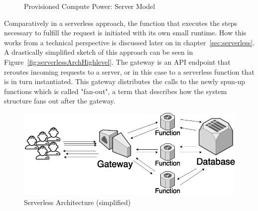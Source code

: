 \begin{figure}[ht]
    \centering
    \caption {Provisioned Compute Power: Server Model}
    \label{graph:provisionedComputePowerServer}
\end{figure}

Comparatively in a serverless approach, the function that executes the steps necessary to fulfill the request is initiated with its own small runtime. How this works from a technical perspective is discussed later on in chapter~\vref{sec:serverless}. A drastically simplified sketch of this approach can be seen in Figure~\vref{fig:serverlessArchHighlevel}. The gateway is an API endpoint that reroutes incoming requests to a server, or in this case to a serverless function that is in turn instantiated. \autocite{Kelly2010UsingInvalidation} This gateway distributes the calls to the newly spun-up functions which is called "fan-out"\autocite{Do2013Limplock}, a term that describes how the system structure fans out after the gateway. 

\begin{figure}[ht]
    \includegraphics[width=\linewidth]{images/drawio/lambda.png}\centering
    \caption {Serverless Architecture (simplified)}
    \label{fig:serverlessArchHighlevel}
\end{figure}

